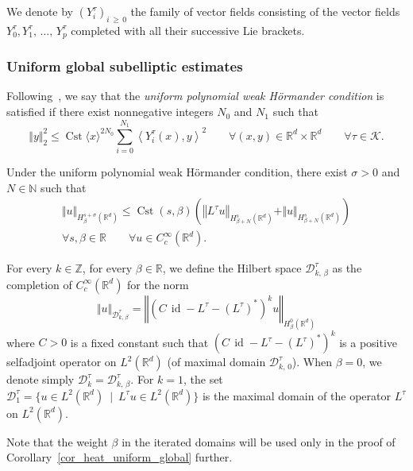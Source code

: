 \documentclass[AHL,Unicode,published]{cedram}
\newcommand*\R{\mathbb{R}}
\newcommand*\N{\mathbb{N}}
\newcommand*\Z{\mathbb{Z}}
\newcommand{\calK}{\mathcal{K}}
\newcommand{\calD}{\mathcal{D}}
\DeclareMathOperator{\Cst}{Cst}
\DeclareMathOperator{\id}{id}
\renewcommand{\geq}{\geqslant}
\renewcommand{\leq}{\leqslant}
\let\oldforall\forall
\renewcommand*{\forall}{\mathrel{\oldforall}}
\begin{document}
We denote by $(Y_i^\tau)_{i\,\geq\,0}$ the family of vector fields consisting of the vector fields $Y_0^\tau,Y_1^\tau,\,\ldots,\,Y_p^\tau$ completed with all their successive Lie brackets.


\subsubsection{Uniform global subelliptic estimates}\label{sec:uniform_global_subelliptic_estimates}
\begin{defi}
Following~\cite{EckmannHairer}, we say that the \emph{uniform polynomial weak H\"ormander condition} is satisfied if there exist nonnegative integers $N_0$ and $N_1$ such that
\begin{equation}\label{UPH_nondegen}
\Vert y\Vert_2^2 \leq \Cst \langle x\rangle^{2N_0} \sum_{i=0}^{N_1} \left\langle Y_i^\tau(x),y\right\rangle^2
\qquad \forall(x,y)\in\R^d\times\R^d\qquad\forall\tau\in\calK.
\end{equation}
\end{defi}

\begin{theo}\label{thm_subelliptic_uniform_global}
Under the uniform polynomial weak H\"ormander condition, there exist $\sigma>0$ and $N\in\N$ such that
\begin{multline*}
\Vert u\Vert_{H^{s+\sigma}_\beta\left(\R^d\right)} \leq \Cst(s,\beta) \left(\left\Vert L^\tau u\right\Vert_{H^s_{\beta+N}\left(\R^d\right)} + \Vert u\Vert_{H^s_{\beta+N}\left(\R^d\right)} \right) \\
\forall s,\beta\in\R \qquad \forall u\in C_c^\infty\left(\R^d\right).
\end{multline*}
\end{theo}

For every $k\in\Z$, for every $\beta\in\R$, we define the Hilbert space $\calD^\tau_{k,\,\beta}$ as the completion of $C_c^\infty(\R^d)$ for the norm
\[
\Vert u\Vert_{\calD^\tau_{k,\,\beta}} = \left\Vert \left(C\,\id - L^\tau - (L^\tau)^*\right)^k u\right\Vert_{H^0_\beta\left(\R^d\right)}
\]
where $C>0$ is a fixed constant such that $(C\,\id - L^\tau - (L^\tau)^*)^k$ is a positive selfadjoint operator on $L^2(\R^d)$ (of maximal domain $\calD^\tau_{k,\,0}$). When $\beta=0$, we denote simply $\calD^\tau_k=\calD^\tau_{k,\,\beta}$. For $k=1$, the set $\calD^\tau_1=\{ u\in L^2(\R^d)\ \mid\ L^\tau u\in L^2(\R^d)\}$ is the maximal domain of the operator $L^\tau$ on $L^2(\R^d)$.

Note that the weight $\beta$ in the iterated domains will be used only in the proof of Corollary~\ref{cor_heat_uniform_global} further.
\end{document}

